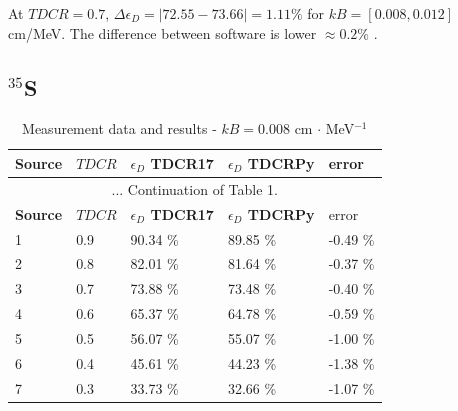 \documentclass[12pt]{iopart}
\begin{document}
At $TDCR = 0.7$, $\Delta \epsilon_D = |72.55 - 73.66| = 1.11 \%$ for $kB = [0.008, 0.012]$ cm/MeV. The difference between software is lower $\approx 0.2 \%$ . 

\pagebreak
\subsection{$^{35}$S}

\begingroup
\footnotesize
\begin{longtable}[l]{| p{} | p{} |p{} |p{} |p{} |} 
\caption{Measurement data and results - $kB = 0.008$ cm $\cdot$ MeV$^{-1}$}
\label{Table1} \\ 
\hline
\textbf{Source} & \textbf{$TDCR$} & \textbf{$\epsilon_{D}$ TDCR17} & \textbf{$\epsilon_{D}$ TDCRPy} & error \\
\endfirsthead
\multicolumn{5}{c}{... Continuation of Table 1.}\\ 
\hline
 \textbf{Source} & \textbf{$TDCR$} & \textbf{$\epsilon_{D}$ TDCR17} & \textbf{$\epsilon_{D}$ TDCRPy} & error \\   \hline 
\endhead
\hline
 1 & 0.9   &   90.34 \% &   89.85 \% &  -0.49 \% \\
 2 & 0.8   &   82.01 \% &   81.64 \% &  -0.37 \% \\
 3 & 0.7   &   73.88 \% &   73.48 \% &  -0.40 \% \\
 4 & 0.6   &   65.37 \% &   64.78 \% &  -0.59 \% \\
 5 & 0.5   &   56.07 \% &   55.07 \% &  -1.00 \% \\
 6 & 0.4   &   45.61 \% &   44.23 \% &  -1.38 \% \\
 7 & 0.3   &   33.73 \% &   32.66 \% &  -1.07 \% \\
\hline
\end{longtable} 
\endgroup
\end{document}
